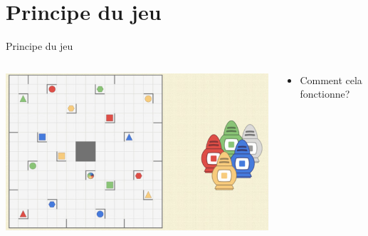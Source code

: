 \documentclass{beamer}
\begin{document}
\section{Principe du jeu}
\begin{frame}{Principe du jeu}
    \begin{columns}
        \begin{column}{0.6\textwidth}
        \vspace{\topsep}
        \includegraphics[width=\columnwidth]{Images/r1.png}%
        \end{column}
        
        \begin{column}{0.4\textwidth}
        \begin{itemize}
        \item Comment cela fonctionne?
        \end{itemize}
        \end{column}
    \end{columns}
\end{frame}
\end{document}
